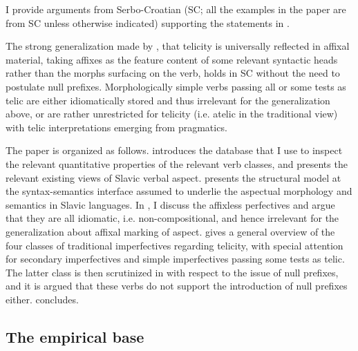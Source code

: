 \documentclass[output=paper]{langscibook}
\begin{document}
\noindent I provide arguments from Serbo-Croatian (SC; all the examples in the paper are from SC unless otherwise indicated) supporting the statements in .

\eanoraggedright\label{ars:ex:Emp-quest}
\eanoraggedright The strong generalization made by \citet{Lazor.2010}, that telicity is universally reflected in affixal material, taking affixes as the feature content of some relevant syntactic heads rather than the morphs surfacing on the verb, holds in SC without the need to postulate null prefixes. \label{ars:ex:Emp-quest-a}
\ex Morphologically simple verbs passing all or some tests as telic are either idiomatically stored and thus irrelevant for the generalization above, or are rather unrestricted for telicity (i.e. atelic in the traditional view) with telic interpretations emerging from pragmatics. \label{ars:ex:Emp-quest-b}
\z\z

\noindent The paper is organized as follows.  introduces the database that I use to inspect the relevant quantitative properties of the relevant verb classes, and  presents the relevant existing views of Slavic verbal aspect.  presents the structural model at the syntax-semantics interface assumed to underlie the aspectual morphology and semantics in Slavic languages. In , I discuss the affixless perfectives and argue that they are all idiomatic, i.e. non-compositional, and hence irrelevant for the generalization about affixal marking of aspect.  gives a general overview of the four classes of traditional imperfectives regarding telicity, with special attention for secondary imperfectives and simple imperfectives passing some tests as telic. The latter class is then scrutinized in  with respect to the issue of null prefixes, and it is argued that these verbs do not support the introduction of null prefixes either.  concludes.  

\subsection{The empirical base}\label{ars:sec:The empirical base}\largerpage
\end{document}
